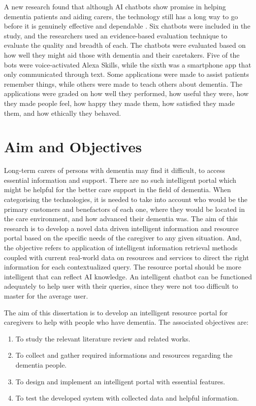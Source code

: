 A new research found that although AI chatbots show promise in helping dementia patients and aiding carers, the technology still has a long way to go before it is genuinely effective and dependable \citep{chat3}. Six chatbots were included in the study, and the researchers used an evidence-based evaluation technique to evaluate the quality and breadth of each. The chatbots were evaluated based on how well they might aid those with dementia and their caretakers. Five of the bots were voice-activated Alexa Skills, while the sixth was a smartphone app that only communicated through text. Some applications were made to assist patients remember things, while others were made to teach others about dementia. The applications were graded on how well they performed, how useful they were, how they made people feel, how happy they made them, how satisfied they made them, and how ethically they behaved.

\section{Aim and Objectives}
Long-term carers of persons with dementia may find it difficult, to access essential information and support. There are no such intelligent portal which might be helpful for the better care support in the field of dementia. When categorising the technologies, it is needed to take into account who would be the primary customers and benefactors of each one, where they would be located in the care environment, and how advanced their dementia was. The aim of this research is to develop a novel data driven intelligent information and resource portal based on the specific needs of the caregiver to any given situation. And, the objective refers to application of intelligent information retrieval methods coupled with current real-world data on resources and services to direct the right information for each contextualized query. The resource portal should be more intelligent that can reflect AI knowledge. An intelligent chatbot can be functioned adequately to help user with their queries, since they were not too difficult to master for the average user. 

The aim of this dissertation is to develop an intelligent resource portal for caregivers to help with people who have dementia. The associated objectives are:
\begin{enumerate}[label=\arabic*)]
	\item To study the relevant literature review and related works.
	\item To collect and gather required informations and resources regarding the dementia people. 
	\item To design and implement an intelligent portal with essential features.
	\item To test the developed system with collected data and helpful information.
\end{enumerate}

